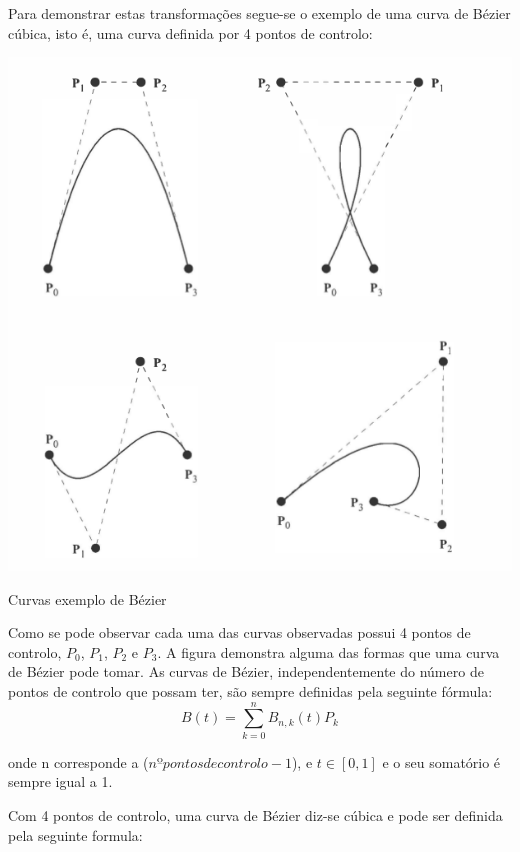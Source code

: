 Para demonstrar estas transformações segue-se o exemplo de uma curva de Bézier
cúbica, isto é, uma curva definida por 4 pontos de controlo:

\begin{center}
 	
 	\includegraphics[width=\textwidth,height=\textheight,keepaspectratio]{resources/exemplos1Bezier.png}
 	\captionsetup{type=figure, width=0.8\linewidth}
	\caption{Curvas exemplo de Bézier}
\label{fig:ssec1:diagram:plane:to:sphere} 
\end{center}

Como se pode observar cada uma das curvas observadas possui 4 pontos de
controlo, $P_0$, $P_1$, $P_2$ e $P_3$. A figura demonstra alguma das formas que
uma curva de Bézier pode tomar. 
As curvas de Bézier, independentemente do número de pontos de controlo que
possam ter, são sempre definidas pela seguinte fórmula:
\begin{equation}
B(t)=\sum_{k=0}^{n}B_{n,k}(t)P_{k}
\end{equation}

onde n corresponde a ($nº pontos de controlo - 1$), e 
$t \in [0,1]$ e o seu somatório é sempre igual a 1.




Com 4 pontos de controlo, uma curva de Bézier diz-se cúbica e pode ser definida
pela seguinte formula:




